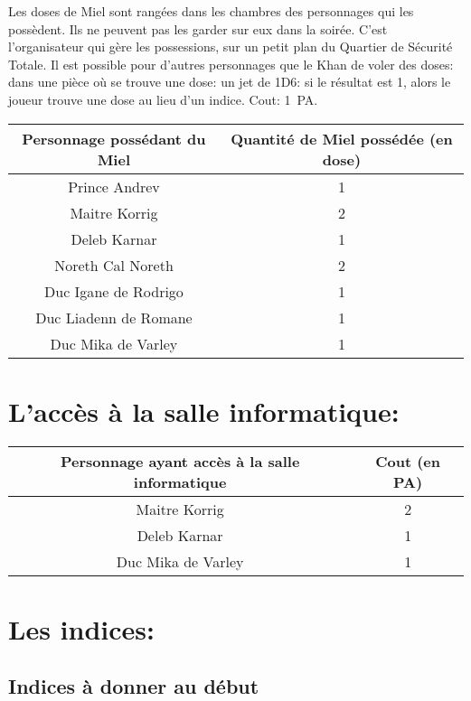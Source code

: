 \documentclass{article}
\begin{document}
Les doses de Miel sont rangées dans les chambres des personnages qui les
possèdent. Ils ne peuvent pas les garder sur eux dans la soirée. C'est
l'organisateur qui gère les possessions, sur un petit plan du Quartier de
Sécurité Totale. Il est possible pour d'autres personnages que le Khan de
voler des doses: dans une pièce où se trouve une dose: un jet de 1D6: si
le résultat est 1, alors le joueur trouve une dose au lieu d'un indice. Cout:
1~PA.

\begin{center}
    \begin{tabular}{|c|c|}
        \hline
        Personnage possédant du Miel & Quantité de Miel possédée (en dose)\\
        \hline
        Prince Andrev & 1 \\
        Maitre Korrig & 2 \\
        Deleb Karnar & 1 \\
        Noreth Cal Noreth & 2 \\
        Duc Igane de Rodrigo & 1 \\
        Duc Liadenn de Romane & 1 \\
        Duc Mika de Varley & 1 \\
        \hline
    \end{tabular}
\end{center}

\section*{L'accès à la salle informatique:}
\begin{center}
    \begin{tabular}{|c|c|}
        \hline
        Personnage ayant accès à la salle informatique & Cout (en PA)\\
        \hline
        Maitre Korrig & 2 \\
        Deleb Karnar & 1 \\
        Duc Mika de Varley & 1 \\
        \hline
    \end{tabular}
\end{center}

\section*{Les indices:}

\subsection*{Indices à donner au début}
\end{document}
